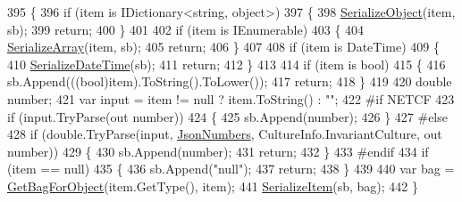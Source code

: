 \begin{DoxyCode}
395         \{
396             \textcolor{keywordflow}{if} (item is IDictionary<string, object>)
397             \{
398                 \hyperlink{a00060_a2a63df270c38b1c9ce7de54b268cdc4f}{SerializeObject}(item, sb);
399                 \textcolor{keywordflow}{return};
400             \}
401 
402             \textcolor{keywordflow}{if} (item is IEnumerable)
403             \{
404                 \hyperlink{a00060_a38298480de46941b764cbbae3ec00ac0}{SerializeArray}(item, sb);
405                 \textcolor{keywordflow}{return};
406             \}
407 
408             \textcolor{keywordflow}{if} (item is DateTime)
409             \{
410                 \hyperlink{a00060_a6874a321c86a87ddeafb25e1f5b37a42}{SerializeDateTime}(sb);
411                 \textcolor{keywordflow}{return};
412             \}
413 
414             \textcolor{keywordflow}{if} (item is \textcolor{keywordtype}{bool})
415             \{
416                 sb.Append(((bool)item).ToString().ToLower());
417                 \textcolor{keywordflow}{return};
418             \}
419 
420             \textcolor{keywordtype}{double} number;
421             var input = item != null ? item.ToString() : \textcolor{stringliteral}{""};
422 \textcolor{preprocessor}{#if NETCF}
423 \textcolor{preprocessor}{}            \textcolor{keywordflow}{if} (input.TryParse(out number))
424             \{
425                 sb.Append(number);
426             \}
427 \textcolor{preprocessor}{#else}
428 \textcolor{preprocessor}{}            \textcolor{keywordflow}{if} (\textcolor{keywordtype}{double}.TryParse(input, \hyperlink{a00060_ad05db33540abe9864b13b6b5c637a354}{JsonNumbers}, CultureInfo.InvariantCulture, out number))
429             \{
430                 sb.Append(number);
431                 \textcolor{keywordflow}{return};
432             \}
433 \textcolor{preprocessor}{#endif}
434 \textcolor{preprocessor}{}            \textcolor{keywordflow}{if} (item == null)
435             \{
436                 sb.Append(\textcolor{stringliteral}{"null"});
437                 \textcolor{keywordflow}{return};
438             \}
439 
440             var bag = \hyperlink{a00060_a3589b9943dbb8872cd4030d4b9ff1a7a}{GetBagForObject}(item.GetType(), item);
441             \hyperlink{a00060_a1ce11382c35fcbc0902e73deec3e617b}{SerializeItem}(sb, bag);
442         \}
\end{DoxyCode}
